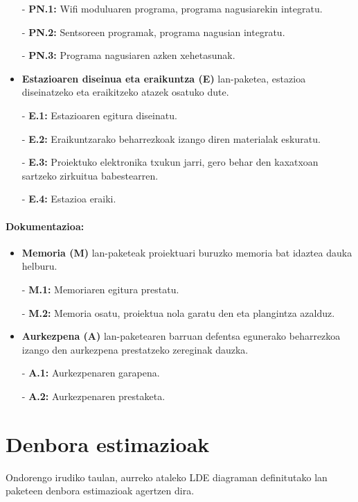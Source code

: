 \begin{itemize}
        - \textbf{PN.1:} Wifi moduluaren programa, programa nagusiarekin integratu.
        
        - \textbf{PN.2:} Sentsoreen programak, programa nagusian integratu.
        
        - \textbf{PN.3:} Programa nagusiaren azken xehetasunak.
        
    \item \textbf{Estazioaren diseinua eta eraikuntza (E)} lan-paketea, estazioa diseinatzeko eta eraikitzeko atazek osatuko dute.
    
        - \textbf{E.1:} Estazioaren egitura diseinatu.
        
        - \textbf{E.2:} Eraikuntzarako beharrezkoak izango diren materialak eskuratu.
        
        - \textbf{E.3:} Proiektuko elektronika txukun jarri, gero behar den kaxatxoan sartzeko zirkuitua babestearren.
        
        - \textbf{E.4:} Estazioa eraiki.
        
\end{itemize}
\paragraph{\textbf{Dokumentazioa:}}
\begin{itemize}
    \item \textbf{Memoria (M)} lan-paketeak proiektuari buruzko memoria bat idaztea dauka helburu.
        
        - \textbf{M.1:} Memoriaren egitura prestatu.
        
        - \textbf{M.2:} Memoria osatu, proiektua nola garatu den eta plangintza azalduz.
        
    \item \textbf{Aurkezpena (A)} lan-paketearen barruan defentsa egunerako beharrezkoa izango den aurkezpena prestatzeko zereginak dauzka.
    
        - \textbf{A.1:} Aurkezpenaren garapena.
        
        - \textbf{A.2:} Aurkezpenaren prestaketa.
\end{itemize}

\newpage
\section{Denbora estimazioak}

Ondorengo irudiko taulan, aurreko ataleko LDE diagraman definitutako lan paketeen denbora estimazioak agertzen dira.

